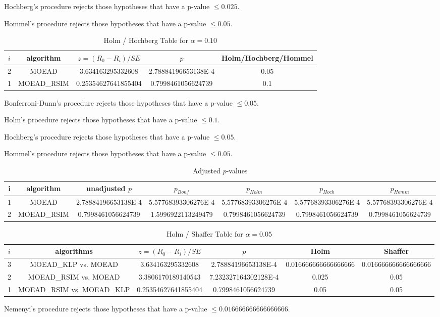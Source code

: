\documentclass[a4paper,10pt]{article}
\begin{document}
\begin{landscape}
Hochberg's procedure rejects those hypotheses that have a p-value $\le0.025$.


Hommel's procedure rejects those hypotheses that have a p-value $\le0.05$.


\begin{table}[!htp]
\centering\tiny
\caption{Holm / Hochberg Table for $\alpha=0.10$}
\begin{tabular}{ccccc}
$i$&algorithm&$z=(R_0 - R_i)/SE$&$p$&Holm/Hochberg/Hommel\\
\hline
2&MOEAD&3.634163295332608&2.78884196653138E-4&0.05\\
1&MOEAD_RSIM&0.25354627641855404&0.7998461056624739&0.1\\
\hline
\end{tabular}
\end{table}
Bonferroni-Dunn's procedure rejects those hypotheses that have a p-value $\le0.05$.


Holm's procedure rejects those hypotheses that have a p-value $\le0.1$.


Hochberg's procedure rejects those hypotheses that have a p-value $\le0.05$.


Hommel's procedure rejects those hypotheses that have a p-value $\le0.05$.


\begin{table}[!htp]
\centering\tiny
\caption{Adjusted $p$-values}
\begin{tabular}{ccccccc}
i&algorithm&unadjusted $p$&$p_{Bonf}$&$p_{Holm}$&$p_{Hoch}$&$p_{Homm}$\\
\hline
1&MOEAD&2.78884196653138E-4&5.57768393306276E-4&5.57768393306276E-4&5.57768393306276E-4&5.57768393306276E-4\\
2&MOEAD_RSIM&0.7998461056624739&1.5996922113249479&0.7998461056624739&0.7998461056624739&0.7998461056624739\\
\hline
\end{tabular}
\end{table}

\begin{table}[!htp]
\centering\tiny
\caption{Holm / Shaffer Table for $\alpha=0.05$}
\begin{tabular}{cccccc}
$i$&algorithms&$z=(R_0 - R_i)/SE$&$p$&Holm&Shaffer\\
\hline
3&MOEAD_KLP vs. MOEAD&3.634163295332608&2.78884196653138E-4&0.016666666666666666&0.016666666666666666\\
2&MOEAD_RSIM vs. MOEAD&3.3806170189140543&7.232327164302128E-4&0.025&0.05\\
1&MOEAD_RSIM vs. MOEAD_KLP&0.25354627641855404&0.7998461056624739&0.05&0.05\\
\hline
\end{tabular}
\end{table}
Nemenyi's procedure rejects those hypotheses that have a p-value $\le0.016666666666666666$.



\end{landscape}
\end{document}
